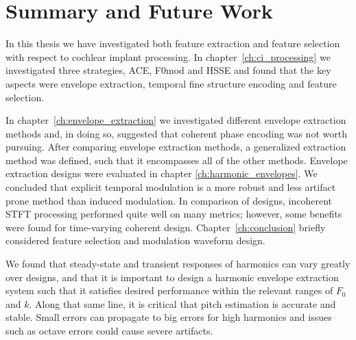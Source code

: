 \documentclass [11pt, proquest,oneside] {ganter_thesis}[2015/03/03]
\begin{document}


\section{Summary and Future Work}

In this thesis we have investigated both feature extraction and feature selection with respect to cochlear implant processing.  In chapter~\ref{ch:ci_processing} we investigated three strategies, ACE, F0mod and HSSE and found that the key aspects were envelope extraction, temporal fine structure encoding and feature selection.

In chapter~\ref{ch:envelope_extraction} we investigated different envelope extraction methods and, in doing so, suggested that coherent phase encoding was not worth pursuing.  After comparing envelope extraction methods, a generalized extraction method was defined, such that it encompasses all of the other methods.  Envelope extraction designs were evaluated in chapter \ref{ch:harmonic_envelopes}.  We concluded that explicit temporal modulation is a more robust and less artifact prone method than induced modulation.  In comparison of designs, incoherent STFT processing performed quite well on many metrics; however, some benefits were found for time-varying coherent design.  Chapter~\ref{ch:conclusion} briefly considered feature selection and modulation waveform design.

We found that steady-state and transient responses of harmonics can vary greatly over designs, and that it is important to design a harmonic envelope extraction system such that it satisfies desired performance within the relevant ranges of $F_0$ and $k$.  Along that same line, it is critical that pitch estimation is accurate and stable.  Small errors can propagate to big errors for high harmonics and issues such as octave errors could cause severe artifacts.
\end{document}
